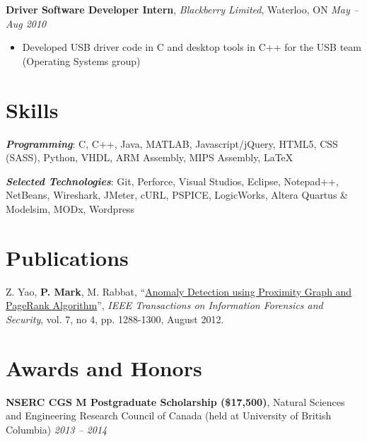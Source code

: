 \documentclass[letterpaper]{article}
\newcommand{\jobtitle}[4]{
  \textbf{#1}, \emph{#2}, {#3} \hfill \emph{#4}\\
}
\newenvironment{jobdescription}{
  \vspace{-4pt}
  \begin{itemize}
  \setlength{\itemsep}{2pt}
  \setlength{\parskip}{0pt}
  \setlength{\parsep}{0pt}
}{\end{itemize}}
\newcommand{\itemdescription}[3]{
  \textbf{#1}, {#2} \hfill \emph{#3}\\
  \medskip
}
\begin{document}
\jobtitle{Driver Software Developer Intern}{Blackberry
Limited}{Waterloo, ON}{May -- Aug 2010} 
\begin{jobdescription}
  \item Developed USB driver code in C and desktop tools in C++ for the USB
  team (Operating Systems group)
\end{jobdescription}


\medskip

\section*{Skills}
\emph{\textbf{Programming}}: C, C++, Java, MATLAB, Javascript/jQuery,
HTML5, CSS (SASS), Python, VHDL, ARM Assembly, MIPS Assembly, \LaTeX\\
\medskip

\emph{\textbf{Selected Technologies}}: Git, Perforce, Visual Studios, Eclipse,
Notepad++, NetBeans, Wireshark, JMeter, cURL, PSPICE, LogicWorks, Altera
Quartus \& Modelsim, MODx, Wordpress\\
\bigskip

\hypertarget{sec:publications}{}
\section*{Publications}
Z. Yao, \textbf{P. Mark}, M. Rabbat, 
``\href{http://ieeexplore.ieee.org/xpl/articleDetails.jsp?arnumber=6175122}
{Anomaly Detection using Proximity Graph and PageRank Algorithm}'', \emph{IEEE 
Transactions on Information Forensics and Security}, vol. 7, no 4, pp. 
1288-1300, August 2012.
\bigskip

\section*{Awards and Honors}
\itemdescription{NSERC CGS M Postgraduate Scholarship (\$17,500)}{Natural 
Sciences and Engineering Research Council of Canada (held at University of
British Columbia)}{2013 -- 2014}
\end{document}
